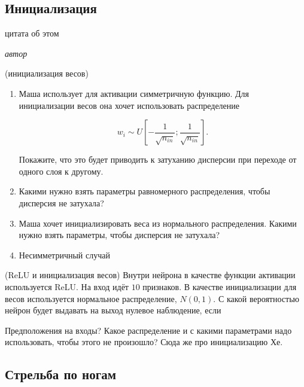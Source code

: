 \subsection{Инициализация}

\epigraph{цитата об этом}{\textit{автор}}


\begin{problem}{(инициализация весов)}
    \begin{enumerate}
        \item Маша использует для активации симметричную функцию. Для инициализации весов она хочет использовать распределение 
        
        $$
        w_i \sim U \left[ - \frac{1}{\sqrt{n_{in}}};  \frac{1}{\sqrt{n_{in}}}  \right].
        $$
        
        Покажите, что это будет приводить к затуханию дисперсии при переходе от одного слоя к другому. 
        
        \item Какими нужно взять параметры равномерного распределения, чтобы дисперсия не затухала? 
        
        \item Маша хочет инициализировать веса из нормального распределения. Какими нужно взять параметры, чтобы дисперсия не затухала? 
        
        \item Несимметричный случай
    \end{enumerate}
\end{problem}

\begin{problem}{(ReLU и инициализация весов)}
    Внутри нейрона в качестве функции активации используется ReLU. На вход идёт $10$ признаков. В качестве инициализации для весов используется нормальное распределение, $N(0,1)$. С какой вероятностью нейрон будет выдавать на выход нулевое наблюдение, если 
    
    Предположения на входы? Какое распределение и с какими параметрами надо использовать, чтобы этого не произошло? Сюда же про инициализацию Хе.
\end{problem}




\subsection{Стрельба по ногам}

